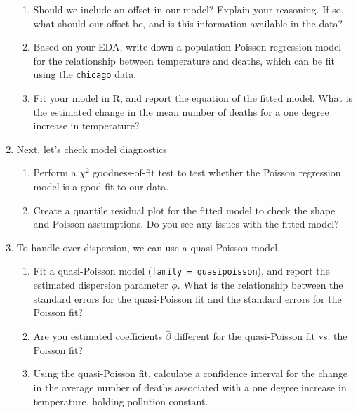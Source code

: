 \documentclass[11pt]{article}
\begin{document}
\begin{enumerate}
\begin{enumerate}
\item Should we include an offset in our model? Explain your reasoning. If so, what should our offset be, and is this information available in the data?

\item Based on your EDA, write down a population Poisson regression model for the relationship between temperature and deaths, which can be fit using the \verb;chicago; data.

\item Fit your model in R, and report the equation of the fitted model. What is the estimated change in the mean number of deaths for a one degree increase in temperature?
\end{enumerate}

\item Next, let's check model diagnostics

\begin{enumerate}
\item Perform a $\chi^2$ goodness-of-fit test to test whether the Poisson regression model is a good fit to our data. 

\item Create a quantile residual plot for the fitted model to check the shape and Poisson assumptions. Do you see any issues with the fitted model?
\end{enumerate}

\item To handle over-dispersion, we can use a quasi-Poisson model. 

\begin{enumerate}
\item Fit a quasi-Poisson model (\verb;family = quasipoisson;), and report the estimated dispersion parameter $\widehat{\phi}$. What is the relationship between the standard errors for the quasi-Poisson fit and the standard errors for the Poisson fit?

\item Are you estimated coefficients $\widehat{\beta}$ different for the quasi-Poisson fit vs. the Poisson fit?

\item Using the quasi-Poisson fit, calculate a confidence interval for the change in the average number of deaths associated with a one degree increase in temperature, holding pollution constant.
\end{enumerate}
\end{enumerate}
\end{document}
